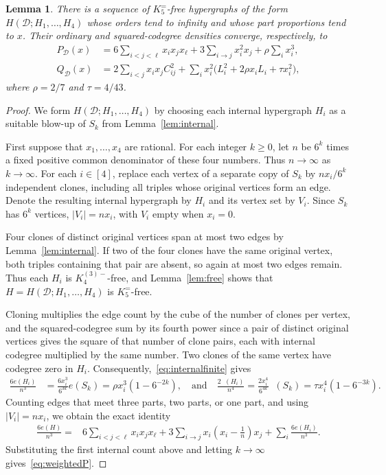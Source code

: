 \documentclass[11pt]{article}
\newtheorem{lemma}[theorem]{Lemma}
\theoremstyle{remark}
\numberwithin{equation}{section}
\DeclareMathOperator{\co}{co_2}
\newcommand{\F}{K_5^{=}}
\newcommand{\Km}{K_4^{(3)-}}
\begin{document}
\begin{lemma}\label{lem:weighted}
There is a sequence of $\F$-free hypergraphs of the form
$H(\mathcal D;H_1,\ldots,H_4)$ whose orders tend to infinity and whose
part proportions tend to $x$. Their ordinary and squared-codegree
densities converge, respectively, to
\begin{align}
 P_{\mathcal D}(x)&=6\sum_{i<j<\ell}x_ix_jx_\ell
          +3\sum_{i\to j}x_i^2x_j+\rho\sum_i x_i^3,
          \label{eq:weightedP}\\
 Q_{\mathcal D}(x)&=2\sum_{i<j}x_ix_j C_{ij}^2
          +\sum_i x_i^2\bigl(L_i^2+2\rho x_iL_i+\tau x_i^2\bigr),
          \label{eq:weightedQ}
\end{align}
where $\rho=2/7$ and $\tau=4/43$.
\end{lemma}

\begin{proof}
We form $H(\mathcal D;H_1,\ldots,H_4)$ by choosing each internal
hypergraph $H_i$ as a suitable blow-up of $S_k$ from
Lemma~\ref{lem:internal}.

First suppose that $x_1,\ldots,x_4$ are rational. For each integer
$k\ge0$, let $n$ be $6^k$ times a fixed positive common denominator of
these four numbers. Thus $n\to\infty$ as $k\to\infty$.
For each $i\in[4]$, replace each vertex of a separate copy of $S_k$
by $nx_i/6^k$ independent clones, including all triples whose original
vertices form an edge. Denote the resulting internal hypergraph by
$H_i$ and its vertex set by $V_i$. Since $S_k$ has $6^k$ vertices,
$|V_i|=nx_i$, with $V_i$ empty when $x_i=0$. 

Four clones of distinct original vertices span at most two edges by
Lemma~\ref{lem:internal}. If two of the four clones have the same original
vertex, both triples containing that pair are absent, so again at most
two edges remain. Thus each $H_i$ is $\Km$-free, and Lemma~\ref{lem:free}
shows that $H=H(\mathcal D;H_1,\ldots,H_4)$ is $\F$-free.

Cloning multiplies the edge count by the cube of the number of clones
per vertex, and the squared-codegree sum by its fourth power since a pair
of distinct original vertices gives the square of that number of clone
pairs, each with internal codegree multiplied by the same number.
Two clones of the same vertex have codegree zero in $H_i$.
Consequently,~\eqref{eq:internalfinite} gives
\begin{align*}
 \frac{6e(H_i)}{n^3}
   &=\frac{6x_i^3}{6^{3k}}e(S_k)
     =\rho x_i^3(1-6^{-2k}),\quad
    \text{and}\quad
 \frac{2\co(H_i)}{n^4}
   =\frac{2x_i^4}{6^{4k}}\co(S_k)
     =\tau x_i^4(1-6^{-3k}).
\end{align*}
Counting edges that meet three parts, two parts, or one part, and using
$|V_i|=nx_i$, we obtain the exact identity
\[
\begin{aligned}
 \frac{6e(H)}{n^3}
   ={}&6\sum_{i<j<\ell}x_ix_jx_\ell
       +3\sum_{i\to j}x_i\left(x_i-\frac1n\right)x_j
    +\sum_i\frac{6e(H_i)}{n^3}.
\end{aligned}
\]
Substituting the first internal count above and letting $k\to\infty$
gives~\eqref{eq:weightedP}.


\end{proof}
\end{document}
